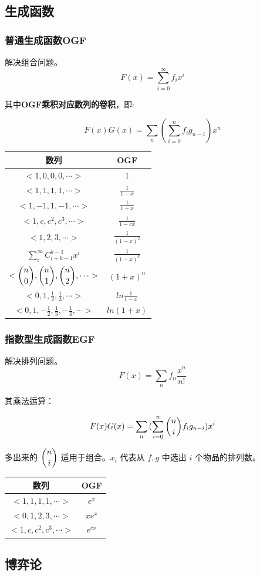 \documentclass[a4paper,11pt]{article}
\begin{document}
\subsection{生成函数}
\subsubsection{普通生成函数OGF}
解决组合问题。
\[F(x)=\sum\limits_{i=0}^{\infty}{f_ix^i}\]

其中\textbf{OGF乘积对应数列的卷积}，即:

\[F(x)G(x)=\sum\limits_{n}(\sum\limits_{i=0}^{n}f_ig_{n-i})x^n\]

\begin{longtable}[]{@{}cc@{}}
\toprule
数列 & OGF\tabularnewline
\midrule
\endhead
\(<1,0,0,0,\cdots>\) & \(1\)\tabularnewline
\(<1,1,1,1,\cdots>\) & \(\frac{1}{1-x}\)\tabularnewline
\(<1,-1,1,-1,\cdots>\) & \(\frac{1}{1+x}\)\tabularnewline
\(<1,c,c^2,c^3,\cdots>\) & \(\frac{1}{1-cx}\)\tabularnewline
\(<1,2,3,\cdots>\) & \(\frac{1}{(1-x)^2}\)\tabularnewline
\(\sum\limits_{i}^{\infty}{C_{i+k-1}^{k-1}{x^i}}\) &
\(\frac{1}{(1-x)^k}\)\tabularnewline
\(<\dbinom{n}{0},\dbinom{n}{1},\dbinom{n}{2},\cdots>\) &
\((1+x)^n\)\tabularnewline
\(<0,1,\frac{1}{2},\frac{1}{3},\cdots>\) &
\(ln\frac{1}{1-x}\)\tabularnewline
\(<0,1,-\frac{1}{2},\frac{1}{3},-\frac{1}{4},\cdots>\) &
\(ln(1+x)\)\tabularnewline
\bottomrule
\end{longtable}
\subsubsection{指数型生成函数EGF}
解决排列问题。
\[F(x)=\sum\limits_{n}{f_n\frac{x^n}{n!}}\]

其乘法运算：

\[F(x)G(x)=\sum\limits_{n}{(\sum\limits_{i=0}^{n}{\dbinom{n}{i}}f_ig_{n-i})x^i}\]

多出来的 \(\dbinom{n}{i}\) 适用于组合。\(x_i\) 代表从 \(f,g\) 中选出
\(i\) 个物品的排列数。

\begin{longtable}[]{@{}cc@{}}
\toprule
数列 & OGF\tabularnewline
\midrule
\endhead
\(<1,1,1,1,\cdots>\) & \(e^x\)\tabularnewline
\(<0,1,2,3,\cdots>\) & \(xe^x\)\tabularnewline
\(<1,c,c^2,c^3,\cdots>\) & \(e^{cx}\)\tabularnewline
\bottomrule
\end{longtable}

\subsection{博弈论}
\end{document}
